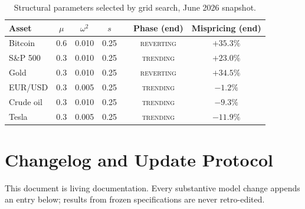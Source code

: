 \documentclass[11pt,a4paper]{article}
\begin{document}
\begin{table}[H]
\centering\small
\caption{Structural parameters selected by grid search, June 2026 snapshot.}
\begin{tabular}{lccc c cc}
\toprule
Asset & $\mu$ & $\omega^2$ & $s$ & & Phase (end) & Mispricing (end) \\
\midrule
Bitcoin & 0.6 & 0.010 & 0.25 & & \textsc{reverting} & $+35.3\%$ \\
S\&P 500 & 0.3 & 0.010 & 0.25 & & \textsc{trending} & $+23.0\%$ \\
Gold & 0.3 & 0.010 & 0.25 & & \textsc{reverting} & $+34.5\%$ \\
EUR/USD & 0.3 & 0.005 & 0.25 & & \textsc{trending} & $-1.2\%$ \\
Crude oil & 0.3 & 0.010 & 0.25 & & \textsc{trending} & $-9.3\%$ \\
Tesla & 0.3 & 0.005 & 0.25 & & \textsc{trending} & $-11.9\%$ \\
\bottomrule
\end{tabular}
\end{table}

\section{Changelog and Update Protocol}\label{app:changelog}

This document is living documentation. Every substantive model change appends an entry below; results from frozen specifications are never retro-edited.
\end{document}
